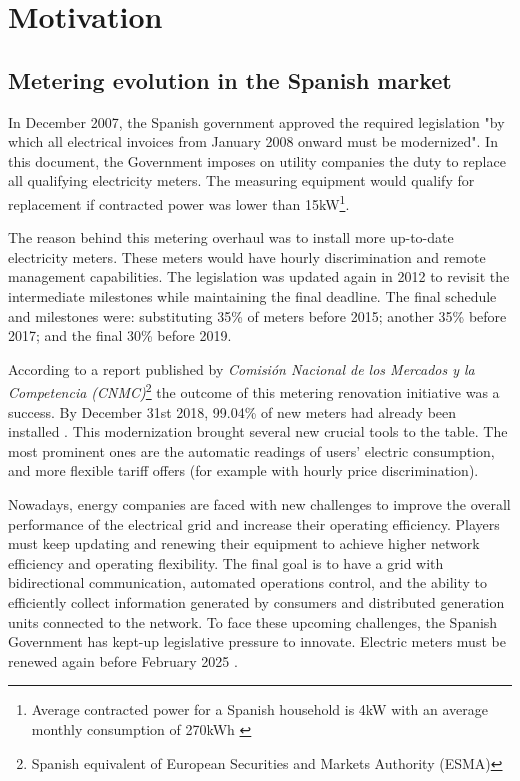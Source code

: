 
\section{Motivation}

\subsection{Metering evolution in the Spanish market}
In December 2007, the Spanish government approved the required legislation \cite{boe_renovacion_contadores_2007} "by which all electrical invoices from January 2008 onward must be modernized". In this document, the Government imposes on utility companies the duty to replace all qualifying electricity meters. The measuring equipment would qualify for replacement if contracted power was lower than 15kW\footnote{Average contracted power for a Spanish household is 4kW with an average monthly consumption of 270kWh \cite{ree_consumo_medio}}.

The reason behind this metering overhaul was to install more up-to-date electricity meters. These meters would have hourly discrimination and remote management capabilities. The legislation was updated again in 2012 \cite{boe_renovacion_contadores_2012} to revisit the intermediate milestones while maintaining the final deadline. The final schedule and milestones were: substituting 35\% of meters before 2015; another 35\% before 2017; and the final 30\% before 2019.

According to a report published by \textit{Comisión Nacional de los Mercados y la Competencia (CNMC)}\footnote{Spanish equivalent of European Securities and Markets Authority (ESMA)} the outcome of this metering renovation initiative was a success. By December 31st 2018, 99.04\% of new meters had already been installed \cite{cnmc_renovacion_contadores}. This modernization brought several new crucial tools to the table. The most prominent ones are the automatic readings of users' electric consumption, and more flexible tariff offers (for example with hourly price discrimination).

Nowadays, energy companies are faced with new challenges to improve the overall performance of the electrical grid and increase their operating efficiency. Players must keep updating and renewing their equipment to achieve higher network efficiency and operating flexibility. The final goal is to have a grid with bidirectional communication, automated operations control, and the ability to efficiently collect information generated by consumers and distributed generation units connected to the network. To face these upcoming challenges, the Spanish Government has kept-up legislative pressure to innovate. Electric meters must be renewed again before February 2025 \cite{boe_renovacion_contadores_2020}.

